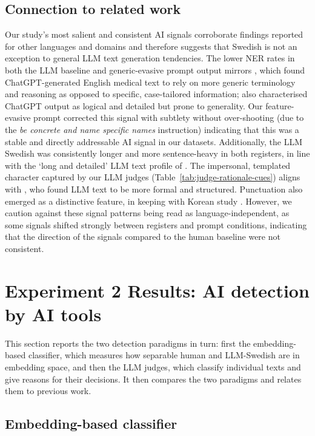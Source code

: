 \documentclass[thesis]{cluu}
\begin{document}
\subsection{Connection to related work}
Our study's most salient and consistent AI signals corroborate findings reported for other languages and domains and therefore suggests that Swedish is not an exception to general LLM text generation tendencies. The lower NER rates in both the LLM baseline and generic-evasive prompt output mirrors \textcite{liao2023differentiating}, which found ChatGPT-generated English medical text to rely on more generic terminology and reasoning as opposed to specific, case-tailored information; \textcite{guo2023closechatgpthumanexperts} also characterised ChatGPT output as logical and detailed but prone to generality. Our feature-evasive prompt corrected this signal with subtlety without over-shooting (due to the \textit{be concrete and name specific names} instruction) indicating that this was a stable and directly addressable AI signal in our datasets. Additionally, the LLM Swedish was consistently longer and more sentence-heavy in both registers, in line with the `long and detailed' LLM text profile of \textcite{guo2023closechatgpthumanexperts}. The impersonal, templated character captured by our LLM judges (Table~\ref{tab:judge-rationale-cues}) aligns with \textcite{tang2023sciencedetectingllmgeneratedtexts}, who found LLM text to be more formal and structured. Punctuation also emerged as a distinctive feature, in keeping with Korean study \textcite{park2025katfishnet}. However, we caution against these signal patterns being read as language-independent, as some signals shifted strongly between registers and prompt conditions, indicating that the direction of the signals compared to the human baseline were not consistent.

\section{Experiment 2 Results: AI detection by AI tools}

This section reports the two detection paradigms in turn: first the embedding-based classifier, which measures how separable human and LLM-Swedish are in embedding space, and then the LLM judges, which classify individual texts and give reasons for their decisions. It then compares the two paradigms and relates them to previous work.

\subsection{Embedding-based classifier}
\end{document}
